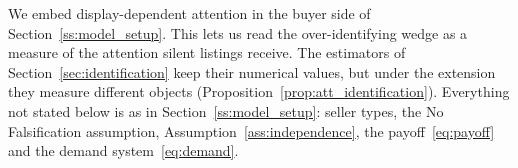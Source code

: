We embed display-dependent attention in the buyer side of Section~\ref{ss:model_setup}. This lets us read the over-identifying wedge as a measure of the attention silent listings receive. The estimators of Section~\ref{sec:identification} keep their numerical values, but under the extension they measure different objects (Proposition~\ref{prop:att_identification}). Everything not stated below is as in Section~\ref{ss:model_setup}: seller types, the No Falsification assumption, Assumption~\ref{ass:independence}, the payoff~\eqref{eq:payoff} and the demand system~\eqref{eq:demand}.
